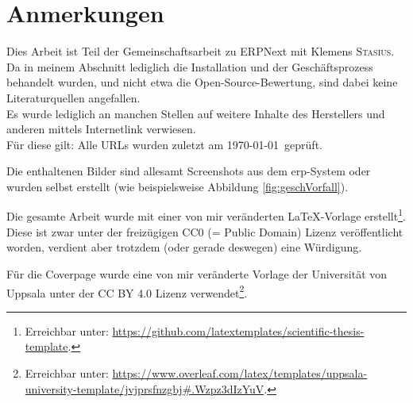 \chapter{Anmerkungen}
Dies Arbeit ist Teil der Gemeinschaftsarbeit zu ERPNext mit Klemens \textsc{Stasius}. Da in meinem Abschnitt lediglich die Installation und der Geschäftsprozess behandelt wurden, und nicht etwa die Open-Source-Bewertung, sind dabei keine Literaturquellen angefallen. \\
Es wurde lediglich an manchen Stellen auf weitere Inhalte des Herstellers und anderen mittels Internetlink verwiesen. \\
Für diese gilt: Alle URLs wurden zuletzt am \today\ geprüft.

Die enthaltenen Bilder sind allesamt Screenshots aus dem \gls{erp}-System oder wurden selbst erstellt (wie beispielsweise Abbildung \ref{fig:geschVorfall}).

Die gesamte Arbeit wurde mit einer von mir veränderten \LaTeX-Vorlage erstellt\footnote{Erreichbar unter: \url{https://github.com/latextemplates/scientific-thesis-template}.}. Diese ist zwar unter der freizügigen CC0 (= Public Domain) Lizenz veröffentlicht worden, verdient aber trotzdem (oder gerade deswegen) eine Würdigung.

Für die Coverpage wurde eine von mir veränderte Vorlage der Universität von Uppsala unter der CC BY 4.0 Lizenz verwendet\footnote{Erreichbar unter: \url{https://www.overleaf.com/latex/templates/uppsala-university-template/jvjprsfnzgbj#.Wzpz3dIzYuV}.}.